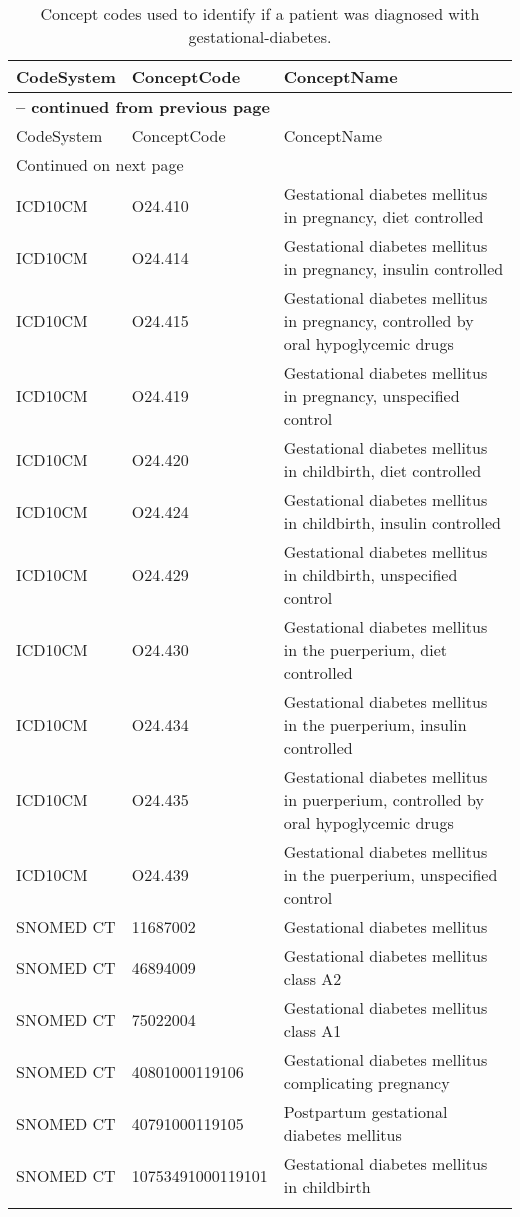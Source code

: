 \begin{longtable}{p{}p{}p{}}
\caption{Concept codes used to identify if a patient was diagnosed with gestational-diabetes.} \\ 
 CodeSystem & ConceptCode & ConceptName \\ 
  \hline 
\endfirsthead 
\multicolumn{3}{p{\textwidth}}{{ \bfseries \tablename \thetable{} -- continued from previous page}} \\ 
\hline CodeSystem & ConceptCode & ConceptName \\ \hline 
\endhead 
\hline \multicolumn{3}{p{\textwidth}}{{Continued on next page}} \\ \hline 
\endfoot 
\hline 
\endlastfoot 
 \hline
ICD10CM & O24.410 & Gestational diabetes mellitus in pregnancy, diet controlled \\ 
  ICD10CM & O24.414 & Gestational diabetes mellitus in pregnancy, insulin controlled \\ 
  ICD10CM & O24.415 & Gestational diabetes mellitus in pregnancy, controlled by oral hypoglycemic drugs \\ 
  ICD10CM & O24.419 & Gestational diabetes mellitus in pregnancy, unspecified control \\ 
  ICD10CM & O24.420 & Gestational diabetes mellitus in childbirth, diet controlled \\ 
  ICD10CM & O24.424 & Gestational diabetes mellitus in childbirth, insulin controlled \\ 
  ICD10CM & O24.429 & Gestational diabetes mellitus in childbirth, unspecified control \\ 
  ICD10CM & O24.430 & Gestational diabetes mellitus in the puerperium, diet controlled \\ 
  ICD10CM & O24.434 & Gestational diabetes mellitus in the puerperium, insulin controlled \\ 
  ICD10CM & O24.435 & Gestational diabetes mellitus in puerperium, controlled by oral hypoglycemic drugs \\ 
  ICD10CM & O24.439 & Gestational diabetes mellitus in the puerperium, unspecified control \\ 
  SNOMED CT & 11687002 & Gestational diabetes mellitus \\ 
  SNOMED CT & 46894009 & Gestational diabetes mellitus class A2 \\ 
  SNOMED CT & 75022004 & Gestational diabetes mellitus class A1 \\ 
  SNOMED CT & 40801000119106 & Gestational diabetes mellitus complicating pregnancy \\ 
  SNOMED CT & 40791000119105 & Postpartum gestational diabetes mellitus \\ 
  SNOMED CT & 10753491000119101 & Gestational diabetes mellitus in childbirth \\ 
  \hline
\label{tab:codes_gestational-diabetes}
\end{longtable}
